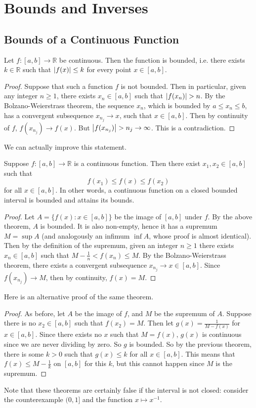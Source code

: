 \documentclass{article}
\begin{document}
\section{Bounds and Inverses}
\subsection{Bounds of a Continuous Function}
\begin{theorem}
	Let $f \colon [a, b] \to \mathbb R$ be continuous. Then the function is bounded, i.e. there exists $k \in \mathbb R$ such that $\abs{f(x)} \leq k$ for every point $x \in [a, b]$.
\end{theorem}
\begin{proof}
	Suppose that such a function $f$ is not bounded. Then in particular, given any integer $n \geq 1$, there exists $x_n \in [a, b]$ such that $\abs{f(x_n)} > n$. By the Bolzano-Weierstrass theorem, the sequence $x_n$, which is bounded by $a \leq x_n \leq b$, has a convergent subsequence $x_{n_j} \to x$, such that $x \in [a, b]$. Then by continuity of $f$, $f(x_{n_j}) \to f(x)$. But $\abs{f(x_{n_j})} > n_j \to \infty$. This is a contradiction.
\end{proof}
\noindent We can actually improve this statement.
\begin{theorem}
	Suppose $f \colon [a, b] \to \mathbb R$ is a continuous function. Then there exist $x_1, x_2 \in [a, b]$ such that
	\[ f(x_1) \leq f(x) \leq f(x_2) \]
	for all $x \in [a, b]$. In other words, a continuous function on a closed bounded interval is bounded and attains its bounds.
\end{theorem}
\begin{proof}
	Let $A = \{ f(x) \colon x \in [a, b] \}$ be the image of $[a, b]$ under $f$. By the above theorem, $A$ is bounded. It is also non-empty, hence it has a supremum $M = \sup A$ (and analogously an infimum $\inf A$, whose proof is almost identical). Then by the definition of the supremum, given an integer $n \geq 1$ there exists $x_n \in [a, b]$ such that $M - \frac{1}{n} < f(x_n) \leq M$. By the Bolzano-Weierstrass theorem, there exists a convergent subsequence $x_{n_j} \to x \in [a, b]$. Since $f(x_{n_j}) \to M$, then by continuity, $f(x) = M$.
\end{proof}
\noindent Here is an alternative proof of the same theorem.
\begin{proof}
	As before, let $A$ be the image of $f$, and $M$ be the supremum of $A$. Suppose there is no $x_2 \in [a, b]$ such that $f(x_2) = M$. Then let $g(x) = \frac{1}{M - f(x)}$ for $x \in [a, b]$. Since there exists no $x$ such that $M = f(x)$, $g(x)$ is continuous since we are never dividing by zero. So $g$ is bounded. So by the previous theorem, there is some $k > 0$ such that $g(x) \leq k$ for all $x \in [a, b]$. This means that $f(x) \leq M - \frac{1}{k}$ on $[a, b]$ for this $k$, but this cannot happen since $M$ is the supremum.
\end{proof}
\noindent Note that these theorems are certainly false if the interval is not closed: consider the counterexample $(0, 1]$ and the function $x \mapsto x^{-1}$.
\end{document}

